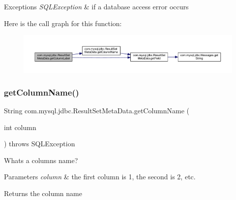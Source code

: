 \begin{DoxyExceptions}{Exceptions}
{\em S\+Q\+L\+Exception} & if a database access error occurs \\
\hline
\end{DoxyExceptions}
Here is the call graph for this function\+:
\nopagebreak
\begin{figure}[H]
\begin{center}
\leavevmode
\includegraphics[width=350pt]{classcom_1_1mysql_1_1jdbc_1_1_result_set_meta_data_a7915a4d0be8c46d029d9b4ca1673bbd9_cgraph}
\end{center}
\end{figure}
\mbox{\label{classcom_1_1mysql_1_1jdbc_1_1_result_set_meta_data_a3d9e5968e455f0ab1e8ffc2263b19e0b}} 
\subsubsection{\texorpdfstring{get\+Column\+Name()}{getColumnName()}}
{\footnotesize\ttfamily String com.\+mysql.\+jdbc.\+Result\+Set\+Meta\+Data.\+get\+Column\+Name (\begin{DoxyParamCaption}\item[{int}]{column }\end{DoxyParamCaption}) throws S\+Q\+L\+Exception}

What\textquotesingle{}s a column\textquotesingle{}s name?


\begin{DoxyParams}{Parameters}
{\em column} & the first column is 1, the second is 2, etc.\\
\hline
\end{DoxyParams}
\begin{DoxyReturn}{Returns}
the column name
\end{DoxyReturn}

